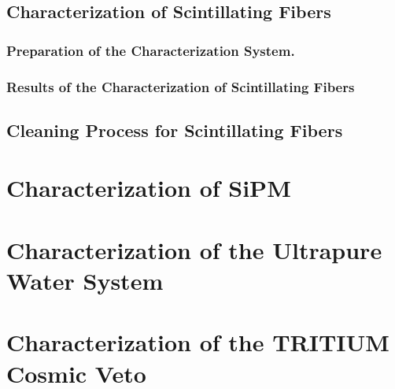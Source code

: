 \documentclass[12pt,a4paper]{book}
\begin{document}
		\subsection{Characterization of Scintillating Fibers}\label{subsec:CharacterizationFibers}
		
		
			\subsubsection{Preparation of the Characterization System.}\label{subsubsec:CharacterizationSystem}
			
		
			\subsubsection{Results of the Characterization of Scintillating Fibers}\label{subsubsec:CharacterizationFibers}
			
		
		\subsection{Cleaning Process for Scintillating Fibers}\label{subsec:CleaningProcess}
		
		
	\section[Characterization of the SiPM]{Characterization of SiPM}\label{sec:CharacterizationSiPM}
	
	
	\section{Characterization of the Ultrapure Water System}\label{sec:CharacterizationUltraPureWaterSystem}
	
					 
	\section[Characterization of the Cosmic Veto]{Characterization of the TRITIUM Cosmic Veto}\label{sec:TritiumActiveVeto}
	
\end{document}
